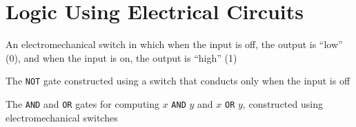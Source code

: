 \documentclass[8pt,a4paper,compress]{beamer}
\begin{document}
\section{Logic Using Electrical Circuits}
\begin{frame}[fragile]
\pause

An electromechanical switch in which when the input is off, the output is ``low'' (0), and when the input is on, the output is ``high'' (1)
\begin{center}
\end{center}

\pause
\bigskip

The \lstinline{NOT} gate constructed using a switch that conducts only when the input is off
\begin{center}
\end{center}

\pause
\bigskip

The \lstinline{AND} and \lstinline{OR} gates for computing $x$ \lstinline{AND} $y$ and $x$ \lstinline{OR} $y$, constructed using electromechanical switches
\begin{center}
\end{center}
\end{frame}
\end{document}
